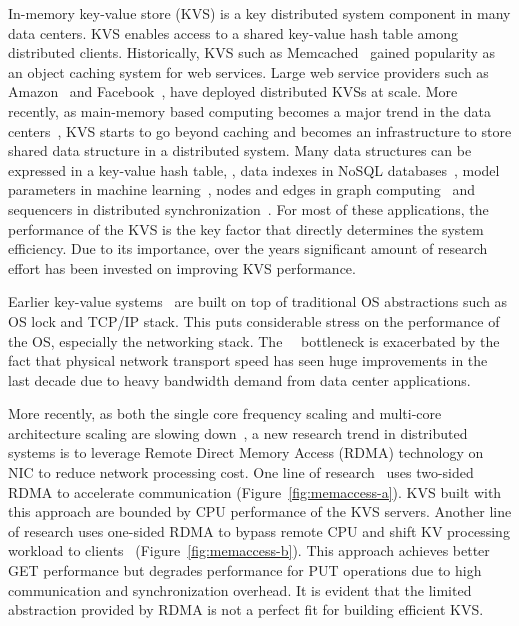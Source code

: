 In-memory key-value store (KVS) is a key distributed system component in many data centers. KVS enables access to a shared key-value hash table among distributed clients. Historically, KVS such as Memcached~\cite{fitzpatrick2004distributed} gained popularity as an object caching system for web services. Large web service providers such as  Amazon~\cite{decandia2007dynamo} and Facebook~\cite{atikoglu2012workload, nishtala2013scaling}, have deployed distributed KVSs at scale. More recently, as main-memory based computing becomes a major trend in the data centers~\cite{ousterhout2010case,dragojevic2014farm}, KVS starts to go beyond caching and becomes an infrastructure to store shared data structure in a distributed system.
Many data structures can be expressed in a key-value hash table, \eg, data indexes in NoSQL databases~\cite{chang2008bigtable}, model parameters in machine learning~\cite{li2014scaling}, nodes and edges in graph computing~\cite{shao2013trinity, xiao17tux2} and sequencers in distributed synchronization~\cite{kalia2016design}. For most of these applications, the performance of the KVS is the key factor that directly determines the system efficiency. Due to its importance, over the years significant amount of research effort has been invested on improving KVS performance. 

Earlier key-value systems~\cite{decandia2007dynamo, fitzpatrick2004distributed, nishtala2013scaling} are built on top of traditional OS abstractions such as OS lock and TCP/IP stack. This puts considerable stress on the performance of the OS, especially the networking stack. The 　bottleneck is exacerbated by the fact that physical network transport speed has seen huge improvements in the last decade due to heavy bandwidth demand from data center applications. 

More recently, as both the single core frequency scaling and multi-core architecture scaling are slowing down~\cite{sutter2005free,esmaeilzadeh2011dark}, a new research trend in distributed systems is to leverage Remote Direct Memory Access (RDMA) technology on NIC to reduce network processing cost. One line of research~\cite{kalia2014using, kalia2016design} uses two-sided RDMA to accelerate communication (Figure~\ref{fig:memaccess-a}). KVS built with this approach are bounded by CPU performance of the KVS servers. Another line of research uses one-sided RDMA to bypass remote CPU and shift KV processing workload to clients~\cite{dragojevic2014farm, mitchell2013using} (Figure~\ref{fig:memaccess-b}). This approach achieves better GET performance but degrades performance for PUT operations due to high communication and synchronization overhead. It is evident that the limited abstraction provided by RDMA is not a perfect fit for building efficient KVS. 

